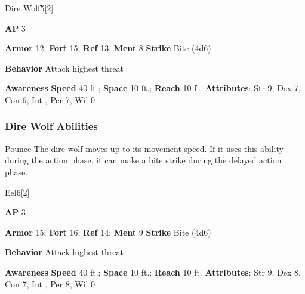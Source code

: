 \begin{monsection}{Dire Wolf}{5}[2]
\vspace{-1em}\vspace{-1em}
\begin{spellcontent}
\begin{spelltargetinginfo}
{\textbf{AP} 3}

\pari \textbf{Armor} 12;
\textbf{Fort} 15;
\textbf{Ref} 13;
\textbf{Ment} 8
\pari \textbf{Strike} Bite  (4d6)



\pari \textbf{Behavior} Attack highest threat
\end{spelltargetinginfo}
\end{spellcontent}

\begin{monsterfooter}
\pari \textbf{Awareness} 
\pari \textbf{Speed} 40 ft.;
\textbf{Space} 10 ft.;
\textbf{Reach} 10 ft.
\pari \textbf{Attributes}:
Str 9,
Dex 7,
Con 6,
Int ,
Per 7,
Wil 0
\end{monsterfooter}
\end{monsection}


\subsubsection{Dire Wolf Abilities}

\begin{freeability}{Pounce}
The dire wolf moves up to its movement speed.
If it uses this ability during the action phase, it can make a bite strike during the delayed action phase.
\end{freeability}

\begin{monsection}{Eel}{6}[2]
\vspace{-1em}\vspace{-1em}
\begin{spellcontent}
\begin{spelltargetinginfo}
{\textbf{AP} 3}

\pari \textbf{Armor} 15;
\textbf{Fort} 16;
\textbf{Ref} 14;
\textbf{Ment} 9
\pari \textbf{Strike} Bite  (4d6)



\pari \textbf{Behavior} Attack highest threat
\end{spelltargetinginfo}
\end{spellcontent}

\begin{monsterfooter}
\pari \textbf{Awareness} 
\pari \textbf{Speed} 40 ft.;
\textbf{Space} 10 ft.;
\textbf{Reach} 10 ft.
\pari \textbf{Attributes}:
Str 9,
Dex 8,
Con 7,
Int ,
Per 8,
Wil 0
\end{monsterfooter}
\end{monsection}

